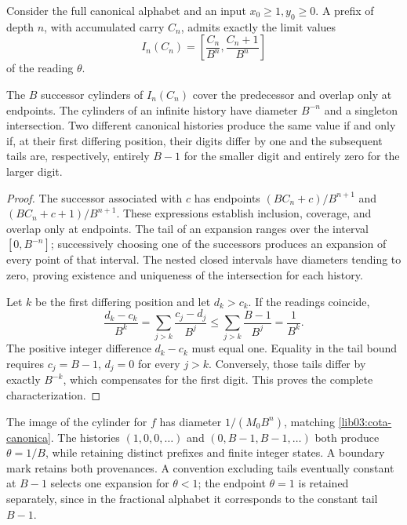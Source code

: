 Consider the full canonical alphabet and an input
\(x_0\geq1,y_0\geq0\). A prefix of depth \(n\), with
accumulated carry \(C_n\), admits exactly the limit values
\begin{equation}
 I_n(C_n)=\left[\frac{C_n}{B^n},\frac{C_n+1}{B^n}\right]
 \label{lib03:cilindro}
\end{equation}
of the reading \(\theta\).

\begin{theorem}
\label{lib03:teo-cilindros}
The \(B\) successor cylinders of \(I_n(C_n)\) cover the predecessor and
overlap only at endpoints. The cylinders of an infinite history
have diameter \(B^{-n}\) and a singleton intersection.
Two different canonical histories produce the same value if and only
if, at their first differing position, their digits differ by one and the
subsequent tails are, respectively, entirely \(B-1\) for the smaller
digit and entirely zero for the larger digit.
\end{theorem}

\begin{proof}
The successor associated with \(c\) has endpoints
\((BC_n+c)/B^{n+1}\) and \((BC_n+c+1)/B^{n+1}\).
These expressions establish inclusion, coverage, and overlap only
at endpoints. The tail of an expansion ranges over the interval
\([0,B^{-n}]\); successively choosing one of the successors produces an
expansion of every point of that interval. The nested closed
intervals have diameters tending to zero, proving existence
and uniqueness of the intersection for each history.

Let \(k\) be the first differing position and let \(d_k>c_k\). If the
readings coincide,
\[
 \frac{d_k-c_k}{B^k}
 =\sum_{j>k}\frac{c_j-d_j}{B^j}
 \leq\sum_{j>k}\frac{B-1}{B^j}=\frac1{B^k}.
\]
The positive integer difference \(d_k-c_k\) must equal one. Equality
in the tail bound requires \(c_j=B-1\), \(d_j=0\) for every
\(j>k\). Conversely, those tails differ by exactly
\(B^{-k}\), which compensates for the first digit. This proves the
complete characterization.
\end{proof}

The image of the cylinder for \(f\) has diameter
\(1/(M_0B^n)\), matching \eqref{lib03:cota-canonica}.
The histories \((1,0,0,\ldots)\) and
\((0,B-1,B-1,\ldots)\) both produce \(\theta=1/B\), while retaining
distinct prefixes and finite integer states. A boundary mark
retains both provenances. A convention excluding tails eventually
constant at \(B-1\) selects one expansion for \(\theta<1\);
the endpoint \(\theta=1\) is retained separately, since in the
fractional alphabet it corresponds to the constant tail \(B-1\).

